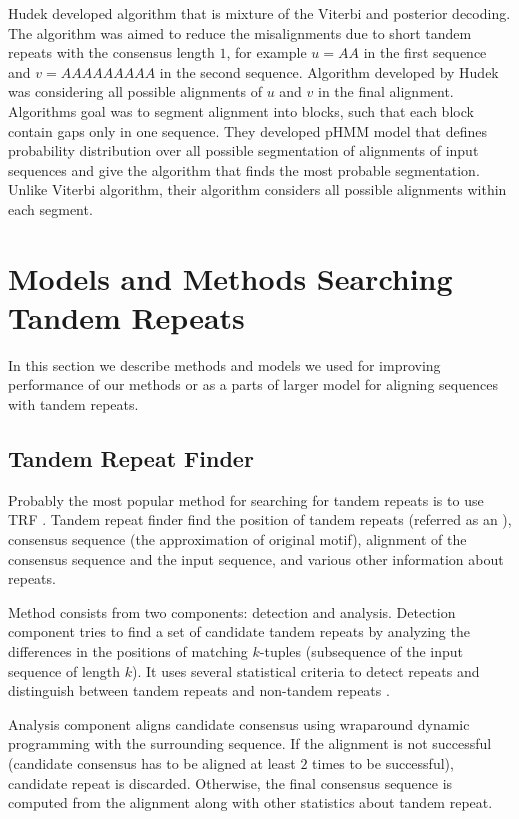 Hudek \cite{Hudek2010} developed algorithm that is mixture of the Viterbi and
posterior decoding. The algorithm was aimed to reduce the misalignments due to
short tandem repeats with the consensus length $1$, for example $u=AA$ in the
first sequence and $v=AAAAAAAAA$ in the second sequence. Algorithm developed by
Hudek was considering all possible alignments of $u$ and $v$ in the final
alignment. Algorithms goal was to segment alignment into blocks, such that each
block contain gaps only in one sequence. They developed pHMM model that defines
probability distribution over all possible segmentation of alignments of input
sequences and give the algorithm that finds the most probable segmentation.
Unlike Viterbi algorithm, their algorithm considers all possible alignments
within each segment.

\section{Models and Methods Searching Tandem Repeats}

In this section we describe methods and models we used for improving
performance of our methods or as a parts of larger model for aligning sequences
with tandem repeats. 

\subsection{Tandem Repeat Finder}

Probably the most popular method for searching for tandem repeats is to use TRF
\cite{Benson1999}.  Tandem repeat finder find the position of tandem repeats
(referred as an ), consensus sequence (the approximation
of original motif), alignment of the consensus sequence and the input sequence,
and various other information about repeats.

Method consists from two components: detection and analysis. Detection
component tries to find a set of candidate tandem repeats by analyzing the
differences in the positions of matching $k$-tuples (subsequence of the input
sequence of length $k$). It uses several statistical criteria to detect repeats
and distinguish between tandem repeats and non-tandem repeats
\cite{Benson1999}.

Analysis component aligns candidate consensus using wraparound dynamic
programming \cite{Myers1989} with the surrounding sequence. If the alignment is
not successful (candidate consensus has to be aligned at least $2$ times to be
successful), candidate repeat is discarded. Otherwise, the final consensus
sequence is computed from the alignment along with other statistics about
tandem repeat.

